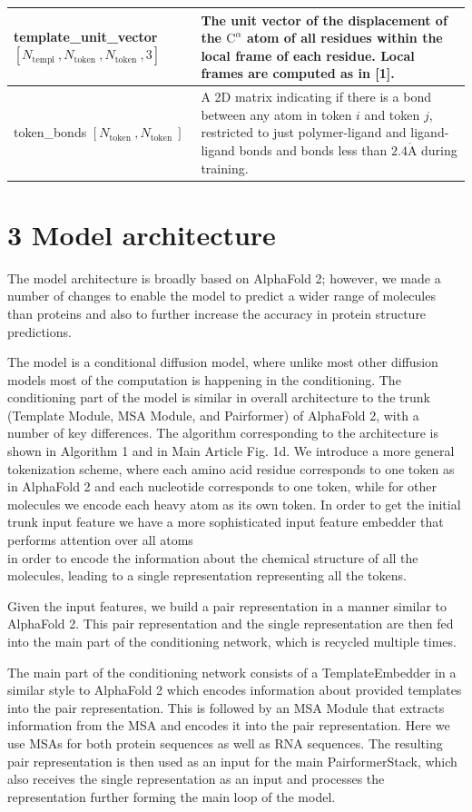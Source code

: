 \documentclass[10pt]{article}
\def\AA{\mathring{\mathrm{A}}}
\begin{document}
\begin{center}
\begin{tabular}{|l|l|}
\hline
template\_unit\_vector $\left[N_{\text {templ }}, N_{\text {token }}, N_{\text {token }}, 3\right]$ & The unit vector of the displacement of the $\mathrm{C}^{\alpha}$ atom of all residues within the local frame of each residue. Local frames are computed as in [1]. \\
\hline
token\_bonds $\left[N_{\text {token }}, N_{\text {token }}\right]$ & A 2D matrix indicating if there is a bond between any atom in token $i$ and token $j$, restricted to just polymer-ligand and ligand-ligand bonds and bonds less than $2.4 \AA$ during training. \\
\hline
\end{tabular}
\end{center}

\section*{3 Model architecture}
The model architecture is broadly based on AlphaFold 2; however, we made a number of changes to enable the model to predict a wider range of molecules than proteins and also to further increase the accuracy in protein structure predictions.

The model is a conditional diffusion model, where unlike most other diffusion models most of the computation is happening in the conditioning. The conditioning part of the model is similar in overall architecture to the trunk (Template Module, MSA Module, and Pairformer) of AlphaFold 2, with a number of key differences. The algorithm corresponding to the architecture is shown in Algorithm 1 and in Main Article Fig. 1d. We introduce a more general tokenization scheme, where each amino acid residue corresponds to one token as in AlphaFold 2 and each nucleotide corresponds to one token, while for other molecules we encode each heavy atom as its own token. In order to get the initial trunk input feature we have a more sophisticated input feature embedder that performs attention over all atoms\\
in order to encode the information about the chemical structure of all the molecules, leading to a single representation representing all the tokens.

Given the input features, we build a pair representation in a manner similar to AlphaFold 2. This pair representation and the single representation are then fed into the main part of the conditioning network, which is recycled multiple times.

The main part of the conditioning network consists of a TemplateEmbedder in a similar style to AlphaFold 2 which encodes information about provided templates into the pair representation. This is followed by an MSA Module that extracts information from the MSA and encodes it into the pair representation. Here we use MSAs for both protein sequences as well as RNA sequences. The resulting pair representation is then used as an input for the main PairformerStack, which also receives the single representation as an input and processes the representation further forming the main loop of the model.
\end{document}
